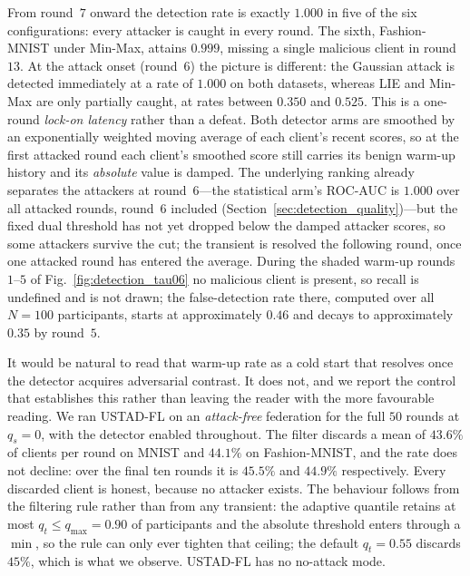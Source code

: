 \documentclass[journal]{IEEEtran}
\begin{document}
From round~$7$ onward the detection rate is exactly $1.000$ in five of the six configurations: every attacker is caught in every round. The sixth, Fashion-MNIST under Min-Max, attains $0.999$, missing a single malicious client in round~$13$. At the attack onset (round~$6$) the picture is different: the Gaussian attack is detected immediately at a rate of $1.000$ on both datasets, whereas LIE and Min-Max are only partially caught, at rates between $0.350$ and $0.525$. This is a one-round \emph{lock-on latency} rather than a defeat. Both detector arms are smoothed by an exponentially weighted moving average of each client's recent scores, so at the first attacked round each client's smoothed score still carries its benign warm-up history and its \emph{absolute} value is damped. The underlying ranking already separates the attackers at round~$6$---the statistical arm's ROC-AUC is $1.000$ over all attacked rounds, round~$6$ included (Section~\ref{sec:detection_quality})---but the fixed dual threshold has not yet dropped below the damped attacker scores, so some attackers survive the cut; the transient is resolved the following round, once one attacked round has entered the average. During the shaded warm-up rounds $1$--$5$ of Fig.~\ref{fig:detection_tau06} no malicious client is present, so recall is undefined and is not drawn; the false-detection rate there, computed over all $N = 100$ participants, starts at approximately $0.46$ and decays to approximately $0.35$ by round~$5$.

It would be natural to read that warm-up rate as a cold start that resolves once the detector acquires adversarial contrast. It does not, and we report the control that establishes this rather than leaving the reader with the more favourable reading. We ran USTAD-FL on an \emph{attack-free} federation for the full $50$ rounds at $q_s = 0$, with the detector enabled throughout. The filter discards a mean of $43.6\%$ of clients per round on MNIST and $44.1\%$ on Fashion-MNIST, and the rate does not decline: over the final ten rounds it is $45.5\%$ and $44.9\%$ respectively. Every discarded client is honest, because no attacker exists. The behaviour follows from the filtering rule rather than from any transient: the adaptive quantile retains at most $q_t \le q_{\max} = 0.90$ of participants and the absolute threshold enters through a $\min$, so the rule can only ever tighten that ceiling; the default $q_t = 0.55$ discards $45\%$, which is what we observe. USTAD-FL has no no-attack mode.
\end{document}
